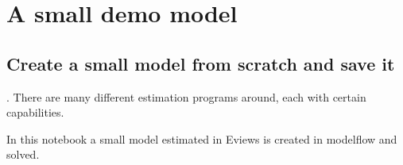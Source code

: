 \documentclass[letterpaper,10pt,english]{jupyterBook}
\begin{document}
\sphinxstepscope


\part{A small demo model}

\sphinxstepscope


\chapter{Create a small model from scratch and save it}
\label{\detokenize{content/howto/smallmodel/modelstart:create-a-small-model-from-scratch-and-save-it}}\label{\detokenize{content/howto/smallmodel/modelstart::doc}}
\sphinxAtStartPar
{}. There are many different estimation programs around, each with certain  capabilities.

\sphinxAtStartPar
In this notebook a small model estimated in Eviews is created in modelflow and solved.
\end{document}
